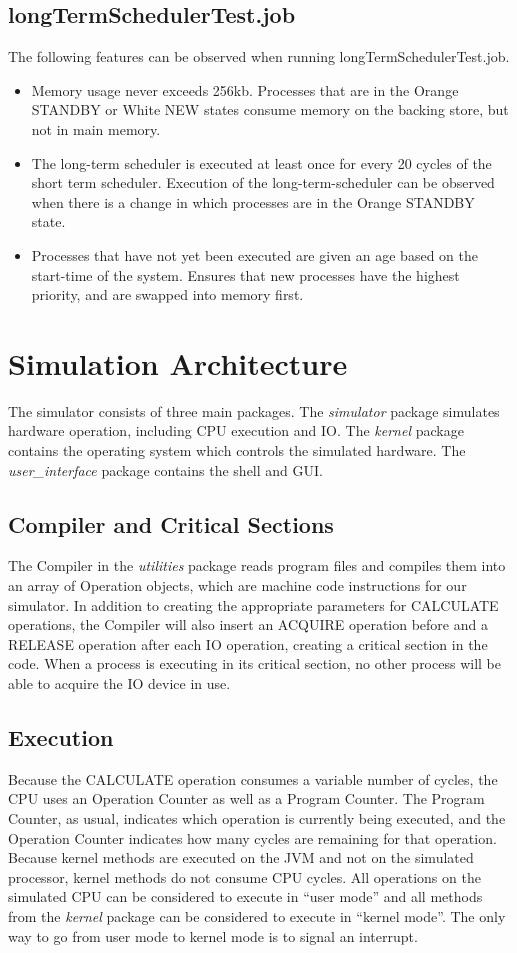 \documentclass[paper=a4, fontsize=11pt]{scrartcl} %
\numberwithin{equation}{section} %
\numberwithin{figure}{section} %
\numberwithin{table}{section} %
\begin{document}
\subsection{longTermSchedulerTest.job}
The following features can be observed when running longTermSchedulerTest.job.
\begin{itemize}
	\item Memory usage never exceeds 256kb. Processes that are in the Orange STANDBY or White NEW states consume memory on the backing store, but not in main memory.
	\item The long-term scheduler is executed at least once for every 20 cycles of the short term scheduler. Execution of the long-term-scheduler can be observed when there is a change in which processes are in the Orange STANDBY state.
	\item Processes that have not yet been executed are given an age based on the start-time of the system. Ensures that new processes have the highest priority, and are swapped into memory first.
\end{itemize}


\section{Simulation Architecture}

The simulator consists of three main packages. The \textit{simulator} package simulates hardware operation, including CPU execution and IO. The \textit{kernel} package contains the operating system which controls the simulated hardware. The \textit{user\_interface} package contains the shell and GUI.


\subsection{Compiler and Critical Sections}
The Compiler in the \textit{utilities} package reads program files and compiles them into an array of Operation objects, which are machine code instructions for our simulator. In addition to creating the appropriate parameters for CALCULATE operations, the Compiler will also insert an ACQUIRE operation before and a RELEASE operation after each IO operation, creating a critical section in the code. When a process is executing in its critical section, no other process will be able to acquire the IO device in use.

\subsection{Execution}
Because the CALCULATE operation consumes a variable number of cycles, the CPU uses an Operation Counter as well as a Program Counter. The Program Counter, as usual, indicates which operation is currently being executed, and the Operation Counter indicates how many cycles are remaining for that operation.
Because kernel methods are executed on the JVM and not on the simulated processor, kernel methods do not consume CPU cycles. All operations on the simulated CPU can be considered to execute in ``user mode'' and all methods from the \textit{kernel} package can be considered to execute in ``kernel mode''. The only way to go from user mode to kernel mode is to signal an interrupt.
\end{document}
